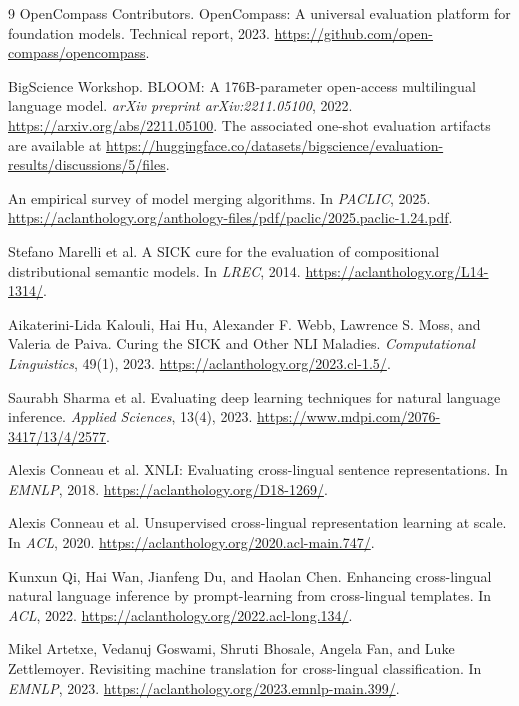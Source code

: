\documentclass[10pt]{article}
\begin{document}
\begin{thebibliography}{9}
OpenCompass Contributors.
\newblock OpenCompass: A universal evaluation platform for foundation models.
\newblock Technical report, 2023.
\url{https://github.com/open-compass/opencompass}.

BigScience Workshop.
\newblock BLOOM: A 176B-parameter open-access multilingual language model.
\newblock \emph{arXiv preprint arXiv:2211.05100}, 2022.
\url{https://arxiv.org/abs/2211.05100}.
The associated one-shot evaluation artifacts are available at
\url{https://huggingface.co/datasets/bigscience/evaluation-results/discussions/5/files}.

An empirical survey of model merging algorithms.
\newblock In \emph{PACLIC}, 2025.
\url{https://aclanthology.org/anthology-files/pdf/paclic/2025.paclic-1.24.pdf}.

Stefano Marelli et al.
\newblock A SICK cure for the evaluation of compositional distributional semantic models.
\newblock In \emph{LREC}, 2014.
\url{https://aclanthology.org/L14-1314/}.

Aikaterini-Lida Kalouli, Hai Hu, Alexander F. Webb, Lawrence S. Moss, and
Valeria de Paiva.
\newblock Curing the SICK and Other NLI Maladies.
\newblock \emph{Computational Linguistics}, 49(1), 2023.
\url{https://aclanthology.org/2023.cl-1.5/}.

Saurabh Sharma et al.
\newblock Evaluating deep learning techniques for natural language inference.
\newblock \emph{Applied Sciences}, 13(4), 2023.
\url{https://www.mdpi.com/2076-3417/13/4/2577}.

Alexis Conneau et al.
\newblock XNLI: Evaluating cross-lingual sentence representations.
\newblock In \emph{EMNLP}, 2018.
\url{https://aclanthology.org/D18-1269/}.

Alexis Conneau et al.
\newblock Unsupervised cross-lingual representation learning at scale.
\newblock In \emph{ACL}, 2020.
\url{https://aclanthology.org/2020.acl-main.747/}.

Kunxun Qi, Hai Wan, Jianfeng Du, and Haolan Chen.
\newblock Enhancing cross-lingual natural language inference by prompt-learning
from cross-lingual templates.
\newblock In \emph{ACL}, 2022.
\url{https://aclanthology.org/2022.acl-long.134/}.

Mikel Artetxe, Vedanuj Goswami, Shruti Bhosale, Angela Fan, and Luke
Zettlemoyer.
\newblock Revisiting machine translation for cross-lingual classification.
\newblock In \emph{EMNLP}, 2023.
\url{https://aclanthology.org/2023.emnlp-main.399/}.


\end{thebibliography}
\end{document}
